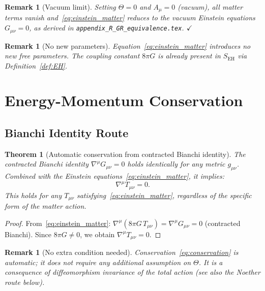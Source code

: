 \documentclass[12pt]{article}
\newtheorem{theorem}[definition]{Theorem}
\newtheorem{remark}[definition]{Remark}
\begin{document}
\begin{remark}[Vacuum limit]
  Setting $\Theta = 0$ and $A_\mu = 0$ (vacuum), all matter terms vanish
  and~\eqref{eq:einstein_matter} reduces to the vacuum Einstein equations
  $G_{\mu\nu} = 0$, as derived in \texttt{appendix\_R\_GR\_equivalence.tex}.
  $\checkmark$
\end{remark}

\begin{remark}[No new parameters]
  Equation~\eqref{eq:einstein_matter} introduces no new free parameters.
  The coupling constant $8\pi G$ is already present in $S_{\mathrm{EH}}$
  via Definition~\ref{def:EH}.
\end{remark}

\section{Energy-Momentum Conservation}
\label{sec:conservation}

\subsection{Bianchi Identity Route}

\begin{theorem}[Automatic conservation from contracted Bianchi identity]
\label{thm:bianchi}
The contracted Bianchi identity $\nabla^\mu G_{\mu\nu} = 0$ holds
identically for any metric $g_{\mu\nu}$.  Combined with the Einstein
equations~\eqref{eq:einstein_matter}, it implies:
\begin{equation}
  \label{eq:conservation}
  \nabla^\mu T_{\mu\nu} = 0.
\end{equation}
This holds for \emph{any} $T_{\mu\nu}$ satisfying~\eqref{eq:einstein_matter},
regardless of the specific form of the matter action.
\end{theorem}

\begin{proof}
  From~\eqref{eq:einstein_matter}: $\nabla^\mu(8\pi G\,T_{\mu\nu})
  = \nabla^\mu G_{\mu\nu} = 0$ (contracted Bianchi).
  Since $8\pi G \neq 0$, we obtain $\nabla^\mu T_{\mu\nu} = 0$.
\end{proof}

\begin{remark}[No extra condition needed]
  Conservation~\eqref{eq:conservation} is \emph{automatic}; it does not
  require any additional assumption on $\Theta$.  It is a consequence of
  diffeomorphism invariance of the total action (see also the Noether
  route below).
\end{remark}
\end{document}
